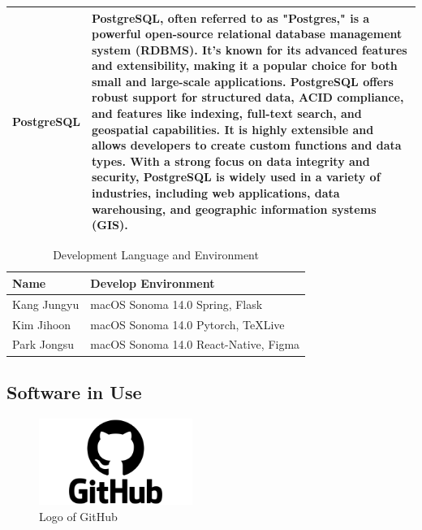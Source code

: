 \documentclass[conference]{IEEEtran}
\begin{document}
\begin{table}[htbp]
    \centering
        \begin{tabular}{| p{1.2cm}|p{6.8cm} |}
             \hline
             PostgreSQL &  PostgreSQL, often referred to as "Postgres," is a powerful open-source relational database management system (RDBMS). It's known for its advanced features and extensibility, making it a popular choice for both small and large-scale applications. PostgreSQL offers robust support for structured data, ACID compliance, and features like indexing, full-text search, and geospatial capabilities. It is highly extensible and allows developers to create custom functions and data types. With a strong focus on data integrity and security, PostgreSQL is widely used in a variety of industries, including web applications, data warehousing, and geographic information systems (GIS). \\ [1ex]
             \hline
        \end{tabular}
    \end{table}
    
    \begin{table}[htbp]
        \caption{Development Language and Environment}
        \centering
        \begin{xtabular}{|p{2cm}|p{4cm}|}
        \hline
        Name & Develop Environment\\
        \hline
        Kang Jungyu & 
        macOS Sonoma 14.0 \hfill \break Spring, Flask\\
        \hline
        Kim Jihoon & 
        macOS Sonoma 14.0 \hfill \break Pytorch, TeXLive\\
        \hline
        Park Jongsu & 
        macOS Sonoma 14.0 \hfill \break React-Native, Figma\\
        \hline
        \end{xtabular}
    \end{table}

    \newpage
    \subsection{Software in Use}
    
        \begin{figure}[htbp]
        \centerline{\includegraphics[width=5cm]{Images/logo/github.png}}
        \label{fig}
        \caption{Logo of GitHub}
        \end{figure}
\end{document}
